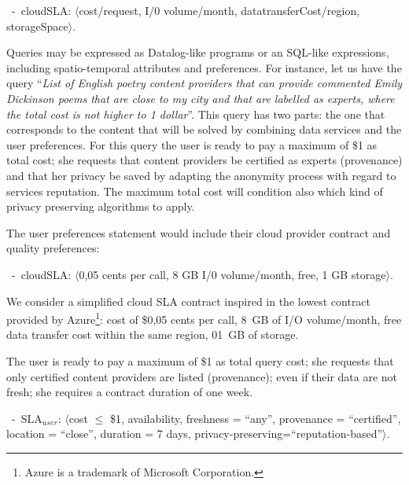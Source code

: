 \begin{trivlist}\sf\footnotesize
 \item[~-~cloudSLA:]  $\langle$cost/request, I/0 volume/month, datatransferCost/region, storageSpace$\rangle$.
 \end{trivlist}
 

Queries may be expressed as Datalog-like programs or an SQL-like expressions, including spatio-temporal attributes and preferences.
For instance, let us have the query ``\textit{List of English poetry content providers that can provide commented Emily Dickinson poems that are close to my city and that are labelled as experts, where the total cost is not higher to 1 dollar}''. 
This query has two parts: the one that corresponds to the content that will be solved by combining data services and the user preferences. For this query the user is ready to pay a maximum of \$1 as total cost; she requests that content providers be certified as experts (provenance) and that her privacy be saved by adapting the anonymity process with regard to services reputation. The maximum total cost will condition also which kind of privacy preserving algorithms to apply.

The user preferences statement would include their cloud provider contract and quality preferences:
\begin{trivlist}\sf\footnotesize
\item[~-~cloudSLA:]  $\langle$0,05 cents per call, 8 GB I/0 volume/month, free, 1 GB storage$\rangle$. 
\end{trivlist}

We consider a simplified cloud SLA contract inspired in the lowest contract provided by Azure\footnote{Azure is a trademark of Microsoft Corporation.}: {\sf cost of \$0,05 cents per call,  8~GB of I/O volume/month, free data transfer cost within the same region,  01~GB of storage}. 

The user is ready to pay a maximum of {\sf \$1 as total query cost}; she requests that only {\sf certified} content providers are listed (provenance); even if their data are not fresh; she requires a contract duration of one week.

\begin{trivlist}\sf\footnotesize
\item[~-~SLA$_\mathit{user}$: ] $\langle$cost $\leq$ \$1, availability, freshness = ``any'', provenance = ``certified'', location = ``close'', duration = 7 days, privacy-preserving=``reputation-based''$\rangle$. 
\end{trivlist}

